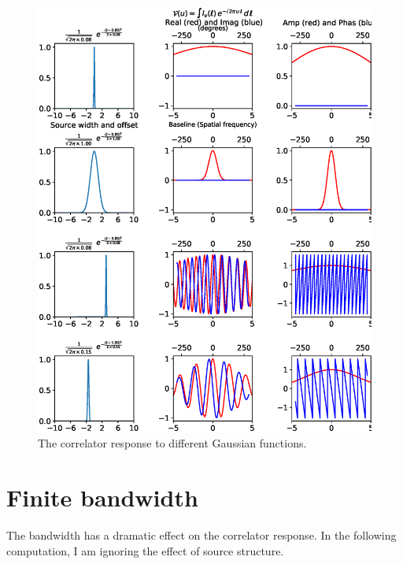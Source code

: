 \documentclass[11pt, a4paper]{article}
\begin{document}
\begin{figure}
  \centering
    \includegraphics[width=\textwidth ]{04-gauss-vis.eps}
  \caption{The correlator response to different Gaussian functions.}
  \label{fig:04-gauss-vis}
\end{figure}

\section{Finite bandwidth}

The bandwidth has a dramatic effect on the correlator response. In the following computation, I am ignoring the effect of source structure.
\end{document}
